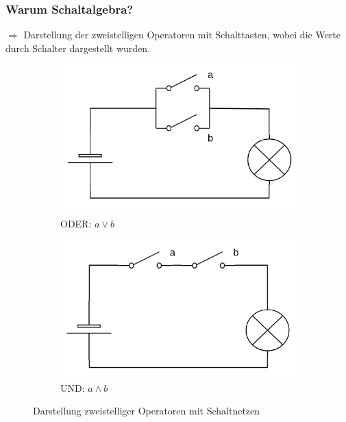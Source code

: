 \documentclass[10pt,a4paper]{scrartcl}
\begin{document}
\subsubsection*{Warum Schaltalgebra?}
\hspace*{2em}$\Rightarrow$ Darstellung der zweistelligen Operatoren mit Schalttasten, wobei die Werte durch Schalter dargestellt wurden.

\begin{figure}[h!]
	\centering
	\begin{subfigure}{.5\textwidth}
		\centering
		\includegraphics[width=0.8\linewidth]{img/schaltnetz_oder}
		\caption{ODER: $a \vee b$}
		\label{fig:sub1}
	\end{subfigure}%
	\begin{subfigure}{.5\textwidth}
		\centering
		\includegraphics[width=.8\linewidth]{img/schaltnetz_und}
		\caption{UND: $a \wedge b$}
		\label{fig:sub2}
	\end{subfigure}
	\caption{Darstellung zweistelliger Operatoren mit Schaltnetzen}
	\label{fig:test}
\end{figure}

\FloatBarrier
\noindent
\end{document}
